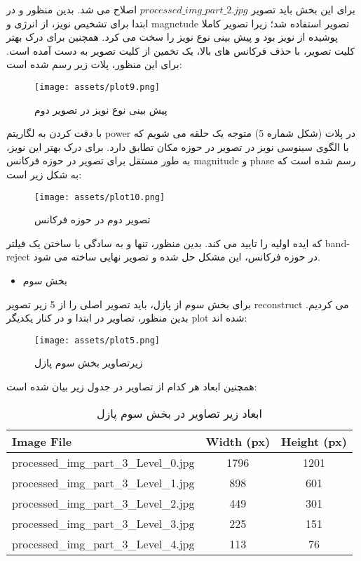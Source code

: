 \documentclass[a4paper,12pt]{article}
\begin{document}
برای این بخش باید تصویر 
$processed\_img\_part\_2.jpg$
اصلاح می شد. بدین منظور و در ابتدا برای تشخیص نویز، از انرژی و magnetude تصویر استفاده شد؛ زیرا تصویر کاملا پوشیده از نویز بود و پیش بینی نوع نویز را سخت می کرد. همچنین برای درک بهتر کلیت تصویر، با حذف فرکانس های بالا، یک تخمین از کلیت تصویر به دست آمده است. برای این منظور، پلات زیر رسم شده است:
\begin{figure}[h]
	\centering
	\texttt{[image: assets/plot9.png]}
	\caption{\textcolor{CustomAccent}{پیش بینی نوع نویز در تصویر دوم}}
\end{figure}


با دقت کردن به لگاریتم power در پلات (شکل شماره 5) متوجه یک حلقه می شویم که با الگوی سینوسی نویز در تصویر در حوزه مکان تطابق دارد. برای درک بهتر این نویز، به طور مستقل برای تصویر در حوزه فرکانس magnitude و phase رسم شده است که به شکل زیر است:


\begin{figure}[h]
	\centering
	\texttt{[image: assets/plot10.png]}
	\caption{\textcolor{CustomAccent}{تصویر دوم در حوزه فرکانس}}
\end{figure}

که ایده اولیه را تایید می کند. بدین منظور، تنها و به سادگی با ساختن یک فیلتر band-reject در حوزه فرکانس، این مشکل حل شده و تصویر نهایی ساخته می شود.

\pagebreak


\begin{itemize}
	\item 
	بخش سوم
\end{itemize}
برای بخش سوم از پازل، باید تصویر اصلی را از 5 زیر تصویر reconstruct می کردیم. بدین منظور، تصاویر در ابتدا و در کنار یکدیگر plot شده اند:

\begin{figure}[h]
	\centering
	\texttt{[image: assets/plot5.png]}
	\caption{\textcolor{CustomAccent}{زیرتصاویر بخش سوم پازل}}
\end{figure}


همچنین ابعاد هر کدام از تصاویر در جدول زیر بیان شده است:

\begin{table}[h!]
	\centering
	\begin{latin}
	\begin{tabular}{|l|c|c|}
		\hline
		\textbf{Image File} & \textbf{Width (px)} & \textbf{Height (px)} \\
		\hline
		processed\_img\_part\_3\_Level\_0.jpg & 1796 & 1201 \\
		processed\_img\_part\_3\_Level\_1.jpg & 898  & 601  \\
		processed\_img\_part\_3\_Level\_2.jpg & 449  & 301  \\
		processed\_img\_part\_3\_Level\_3.jpg & 225  & 151  \\
		processed\_img\_part\_3\_Level\_4.jpg & 113  & 76   \\
		\hline
	\end{tabular}
	\end{latin}
	\caption{ابعاد زیر تصاویر در بخش سوم پازل}
\end{table}
\end{document}
